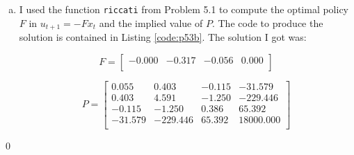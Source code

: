 \begin{homeworkProblem}[Problem 5.3]
{\begin{enumerate}[a.]
        These matrices map the problem into an optimal linear regulator problem. Specifically the problem is to maximize with respect to $u$

        \begin{align} \label{eq:p3e7}
          - \sum_{t=0}^{\infty} \beta^t \{ x_t' R x_t + u_t'Qu_t + 2 u_t' H x_t \}
        \end{align}

        subject to the law of motion

        \begin{align} \label{eq:p3e8}
          x_{t+1} = Ax_t + B u_t
        \end{align}

      \item I used the function \texttt{riccati} from Problem 5.1 to compute the optimal policy $F$ in $u_{t+1} = -F x_t$ and the implied value of $P$. The code to produce the solution is contained in Listing \ref{code:p53b}. The solution I got was:

        $$F =
        \begin{bmatrix}
          -0.000 & -0.317 & -0.056 & 0.000\\
        \end{bmatrix}
        $$

        $$
        P =
        \begin{bmatrix}
          0.055 & 0.403 & -0.115 & -31.579\\
          0.403 & 4.591 & -1.250 & -229.446\\
          -0.115 & -1.250 & 0.386 & 65.392\\
          -31.579 & -229.446 & 65.392 & 18000.000\\
        \end{bmatrix}
        $$
    \end{enumerate}

    
    \qed

  }
\end{homeworkProblem}
